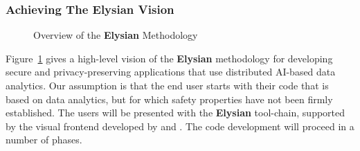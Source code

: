\documentclass[a4paper,11pt]{article}
\newcommand{\project}[1]{\textbf{#1}\xspace}
\newcommand{\SECURITY}{\project{Elysian}}
\newcommand{\TheProject}{\SECURITY}
\begin{document}
\subsubsection{Achieving The \TheProject{} Vision}

\begin{figure}[tp]
  \begin{center}
  \vspace{-5mm}
  \caption{Overview of the \TheProject{} Methodology}
  \label{fig:overview}
  \end{center}
  \end{figure}

Figure~\ref{fig:overview} gives a high-level vision of the \TheProject{} methodology for developing secure and privacy-preserving applications that use distributed AI-based data analytics. Our assumption is that the end user starts with their code that is based on data analytics, but for which safety properties have not been firmly established. The users will be presented with the \TheProject{} tool-chain, supported by the visual frontend developed by \USTANshort{} and \YAGshort{}. The code development will proceed in a number of phases.
\end{document}
